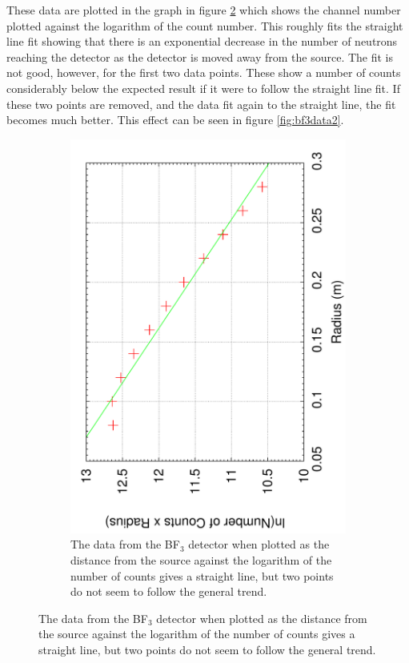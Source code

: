These data are plotted in the graph in figure \ref{fig:bf3data1} which shows the channel number plotted against the logarithm of the count number. This roughly fits the straight line fit showing that there is an exponential decrease in the number of neutrons reaching the detector as the detector is moved away from the source. The fit is not good, however, for the first two data points. These show a number of counts considerably below the expected result if it were to follow the straight line fit. If these two points are removed, and the data fit again to the straight line, the fit becomes much better. This effect can be seen in figure \ref{fig:bf3data2}. 
\begin{figure}[ht]
  \centering
  \begin{subfigure}[b]{0.48\textwidth}
    \centering
    \includegraphics[angle=270,width=\textwidth]{BF3data1.pdf}
    \caption{The data from the BF$_3$ detector when plotted as the distance from the source against the logarithm of the number of counts gives a straight line, but two points do not seem to follow the general trend.\label{fig:bf3data1}}

\end{subfigure}
\end{figure}
